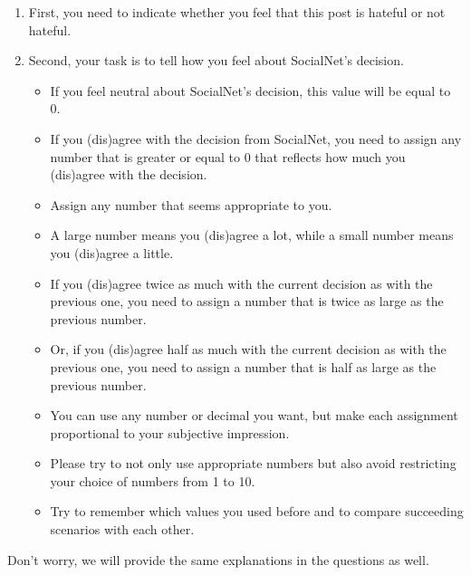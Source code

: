 \begin{enumerate}
    \item First, you need to indicate whether you feel that this post is hateful or not hateful.
    \item Second, your task is to tell how you feel about SocialNet's decision.
          \begin{itemize}
              \item If you feel neutral about SocialNet's decision, this value will be equal to 0.
              \item If you (dis)agree with the decision from SocialNet, you need to assign any number that is greater or equal to 0 that reflects how much you (dis)agree with the decision.
              \item Assign any number that seems appropriate to you.
              \item A large number means you (dis)agree a lot, while a small number means you (dis)agree a little.
              \item If you (dis)agree twice as much with the current decision as with the previous one, you need to assign a number that is twice as large as the previous number.
              \item Or, if you (dis)agree half as much with the current decision as with the previous one, you need to assign a number that is half as large as the previous number.
              \item You can use any number or decimal you want, but make each assignment proportional to your subjective impression.
              \item Please try to not only use appropriate numbers but also avoid restricting your choice of numbers from 1 to 10.
              \item Try to remember which values you used before and to compare succeeding scenarios with each other.
          \end{itemize}
\end{enumerate}

\begin{flushleft}
    Don't worry, we will provide the same explanations in the questions as well.
\end{flushleft}

